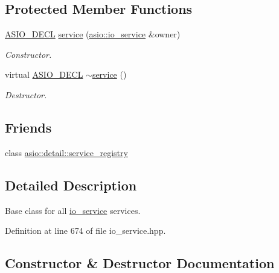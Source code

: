 \subsection*{Protected Member Functions}
\begin{DoxyCompactItemize}
\item 
\hyperlink{config_8hpp_ab54d01ea04afeb9a8b39cfac467656b7}{A\+S\+I\+O\+\_\+\+D\+E\+C\+L} \hyperlink{classasio_1_1io__service_1_1service_a232ccb62d3fbe59c5037fdde4ec0bc01}{service} (\hyperlink{classasio_1_1io__service}{asio\+::io\+\_\+service} \&owner)
\begin{DoxyCompactList}\small\item\em Constructor. \end{DoxyCompactList}\item 
virtual \hyperlink{config_8hpp_ab54d01ea04afeb9a8b39cfac467656b7}{A\+S\+I\+O\+\_\+\+D\+E\+C\+L} \hyperlink{classasio_1_1io__service_1_1service_a04b8d9a842a3f24ee7c060c0a10ac967}{$\sim$service} ()
\begin{DoxyCompactList}\small\item\em Destructor. \end{DoxyCompactList}\end{DoxyCompactItemize}
\subsection*{Friends}
\begin{DoxyCompactItemize}
\item 
class \hyperlink{classasio_1_1io__service_1_1service_a710247c6dc5880a6111aa99d4d256811}{asio\+::detail\+::service\+\_\+registry}
\end{DoxyCompactItemize}


\subsection{Detailed Description}
Base class for all \hyperlink{classasio_1_1io__service}{io\+\_\+service} services. 

Definition at line 674 of file io\+\_\+service.\+hpp.



\subsection{Constructor \& Destructor Documentation}
\hypertarget{classasio_1_1io__service_1_1service_a232ccb62d3fbe59c5037fdde4ec0bc01}{}
